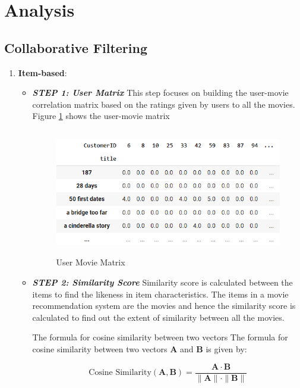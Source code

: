 \documentclass[a4paper,10pt]{article}
\begin{document}
\section{Analysis}
\subsection{Collaborative Filtering}

\begin{enumerate}
    \item \textbf{Item-based}: 
    \vspace{2}
    \begin{itemize}
        \item  \textbf{\textit{STEP 1: User Matrix}}
        \vspace{2}
        This step focuses on building the user-movie correlation matrix based on the ratings given by users to all the movies. Figure \ref{user_movie} shows the user-movie matrix 

        \begin{figure}[ht]
        
\centering
\includegraphics[height=5.5cm]{figures/user_movie.png}
\caption{User Movie Matrix}
\label{user_movie}
\end{figure}
 \item  \textbf{\textit{STEP 2: Similarity Score }} 
        Similarity score is calculated between the items to find the likeness in item characteristics. The items in a movie recommendation system are the movies and hence the similarity score is calculated to find out the extent of similarity between all the movies.

        The formula for cosine similarity between two vectors
The formula for cosine similarity between two vectors $\mathbf{A}$ and $\mathbf{B}$ is given by:

\[
\text{Cosine Similarity}(\mathbf{A}, \mathbf{B}) = \frac{\mathbf{A} \cdot \mathbf{B}}{\|\mathbf{A}\| \cdot \|\mathbf{B}\|}
\]



\end{itemize}
\end{enumerate}
\end{document}
